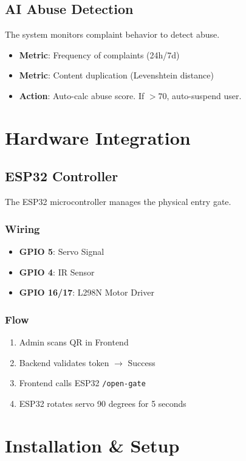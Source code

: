 \documentclass[11pt,a4paper]{report}
\begin{document}
\section{AI Abuse Detection}
The system monitors complaint behavior to detect abuse.
\begin{itemize}
    \item \textbf{Metric}: Frequency of complaints (24h/7d)
    \item \textbf{Metric}: Content duplication (Levenshtein distance)
    \item \textbf{Action}: Auto-calc abuse score. If $>70$, auto-suspend user.
\end{itemize}

\chapter{Hardware Integration}

\section{ESP32 Controller}
The ESP32 microcontroller manages the physical entry gate.

\subsection{Wiring}
\begin{itemize}
    \item \textbf{GPIO 5}: Servo Signal
    \item \textbf{GPIO 4}: IR Sensor
    \item \textbf{GPIO 16/17}: L298N Motor Driver
\end{itemize}

\subsection{Flow}
\begin{enumerate}
    \item Admin scans QR in Frontend
    \item Backend validates token $\rightarrow$ Success
    \item Frontend calls ESP32 \texttt{/open-gate}
    \item ESP32 rotates servo 90 degrees for 5 seconds
\end{enumerate}

\chapter{Installation \& Setup}
\end{document}

